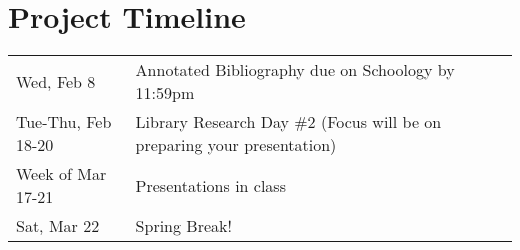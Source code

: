 \documentclass[10pt]{exam}
\begin{document}
\section*{Project Timeline}

\begin{tabular}{ll}
  Wed, Feb 8 & 
  Annotated Bibliography due on Schoology by 11:59pm
  \\[1em]
  Tue-Thu, Feb 18-20 & 
  Library Research Day \#2 (Focus will be on preparing your presentation)
  \\[1em]
  Week of Mar 17-21 & 
  Presentations in class
  \\[1em]
  Sat, Mar 22 &
  Spring Break!
\end{tabular}
\end{document}
